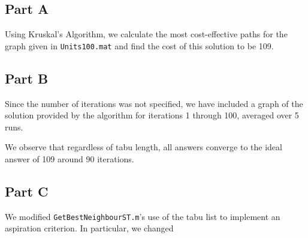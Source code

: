 \documentclass[a4paper]{article}
\begin{document}



\subsection{Part A}


Using Kruskal's Algorithm, we calculate the most cost-effective paths for the
graph given in \texttt{Units100.mat} and find the cost of this solution to be
109.

\subsection{Part B}


Since the number of iterations was not specified, we have included a graph of the solution provided by the algorithm for iterations 1 through 100, averaged over 5 runs.

We observe that regardless of tabu length, all answers converge to the ideal answer of 109 around 90 iterations.



\subsection{Part C}


We modified \texttt{GetBestNeighbourST.m}'s use of the tabu list to implement an aspiration criterion. In particular, we changed
\end{document}
